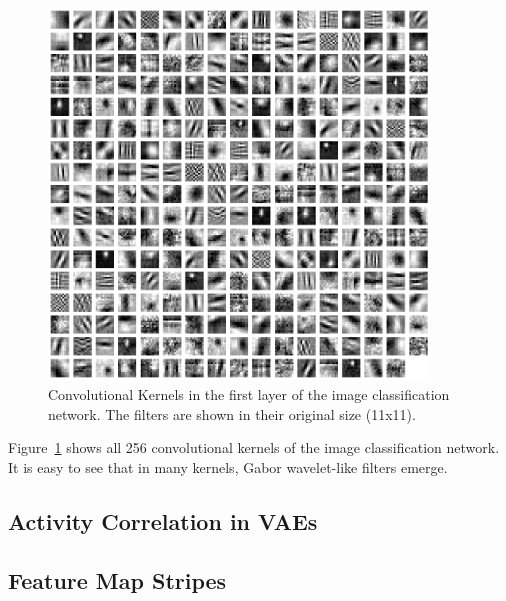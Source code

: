 \documentclass[11pt]{article}
\begin{document}
    \begin{figure}
        \centering
        \includegraphics[width=0.9\textwidth]{images/alexnet_classification_l1_kernels.png}
        \caption[Image classification - Layer 1 Kernels]{Convolutional Kernels in the first layer of the image classification network. The filters are shown in their original size (11x11).}
        \label{fig:classification_layer1_kernels}
    \end{figure}

    Figure~\ref{fig:classification_layer1_kernels} shows all 256 convolutional kernels of the image classification network.
    It is easy to see that in many kernels, Gabor wavelet-like filters emerge.

    \subsection{Activity Correlation in \acp{VAE}}\label{subsec:results_activity-correlation-in-vaes}

    \subsection{Feature Map Stripes}\label{subsec:feature-map-stripes}
\end{document}
